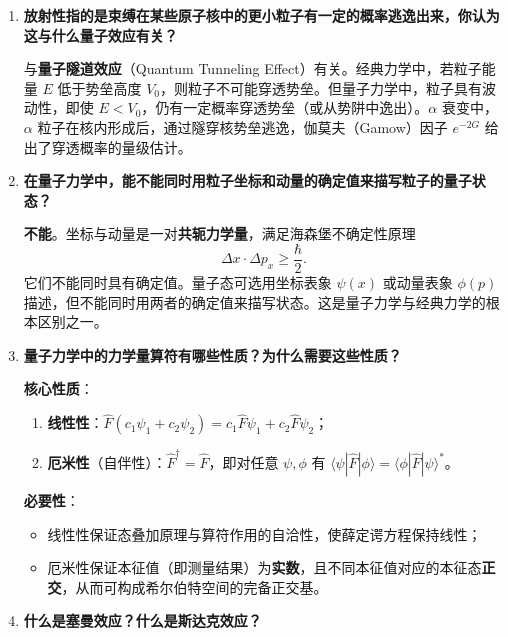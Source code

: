 \begin{enumerate}[label=\textbf{\arabic*.}, leftmargin=2em, itemsep=0.8em]
\item \textbf{放射性指的是束缚在某些原子核中的更小粒子有一定的概率逃逸出来，你认为这与什么量子效应有关？}

与\textbf{量子隧道效应}（Quantum Tunneling Effect）有关。经典力学中，若粒子能量 $E$ 低于势垒高度 $V_0$，则粒子不可能穿透势垒。但量子力学中，粒子具有波动性，即使 $E<V_0$，仍有一定概率穿透势垒（或从势阱中逸出）。$\alpha$ 衰变中，$\alpha$ 粒子在核内形成后，通过隧穿核势垒逃逸，伽莫夫（Gamow）因子 $e^{-2G}$ 给出了穿透概率的量级估计。

\item \textbf{在量子力学中，能不能同时用粒子坐标和动量的确定值来描写粒子的量子状态？}

\textbf{不能}。坐标与动量是一对\textbf{共轭力学量}，满足海森堡不确定性原理
\[
    \Delta x \cdot \Delta p_x \ge \frac{\hbar}{2}.
\]
它们不能同时具有确定值。量子态可选用坐标表象 $\psi(x)$ 或动量表象 $\phi(p)$ 描述，但不能同时用两者的确定值来描写状态。这是量子力学与经典力学的根本区别之一。

\item \textbf{量子力学中的力学量算符有哪些性质？为什么需要这些性质？}

\textbf{核心性质}：
\begin{enumerate}[nosep, label=(\arabic*)]
    \item \textbf{线性性}：$\hat{F}(c_1\psi_1 + c_2\psi_2) = c_1\hat{F}\psi_1 + c_2\hat{F}\psi_2$；
    \item \textbf{厄米性}（自伴性）：$\hat{F}^\dagger = \hat{F}$，即对任意 $\psi,\phi$ 有 $\langle\psi|\hat{F}|\phi\rangle = \langle\phi|\hat{F}|\psi\rangle^*$。
\end{enumerate}

\textbf{必要性}：
\begin{itemize}[nosep]
    \item 线性性保证态叠加原理与算符作用的自洽性，使薛定谔方程保持线性；
    \item 厄米性保证本征值（即测量结果）为\textbf{实数}，且不同本征值对应的本征态\textbf{正交}，从而可构成希尔伯特空间的完备正交基。
\end{itemize}

\item \textbf{什么是塞曼效应？什么是斯达克效应？}


\end{enumerate}
